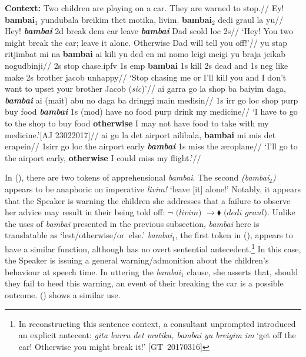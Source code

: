 \pex[interpartskip=1ex]
\a{}\begingl
\glpreamble \textbf{Context:} Two children are playing on a car. They are warned to stop.//
\gla Ey! \textbf{bambai$_1$} yundubala breikim thet motika, livim. \textbf{bambai$_2$} dedi graul la yu//
\glb Hey! \textbf{\textit{bambai}} 2d break {\sc dem} car leave \textbf{\textit{bambai}} Dad scold {\sc loc} 2s//
\glft `Hey! You two might break the car; leave it alone. Otherwise Dad will tell you off!'\trailingcitation[A\&SB: 273]//
\endgl
\a
\begingl{}
\gla yu stap ritjimbat mi na \textbf{bambai} ai kili yu ded en mi nomo leigi meigi yu braja jeikab nogudbinji//
\glb 2s stop chase.\gls{ipfv} 1s {\sc emp} {\bf bambai} 1s kill 2s dead and 1s \gls{neg} like make 2s brother jacob unhappy//
\glft`Stop chasing me or I'll kill you and I don't want to upset your brother Jacob (\textit{sic})'//
\endgl
\a{}\begingl\gla ai garra go la shop ba baiyim daga, \textbf{\textit{bambai}} ai (mait) abu no daga ba dringgi main medisin//
\glb 1s {\sc irr} go {\sc loc} shop {\sc purp} buy food \textit{\textbf{bambai}} 1s (\gls{mod}) have no food \gls{purp} drink my medicine//
\glft `I have to go to the shop to buy food \textbf{otherwise} I may not have food to take with my medicine.'\hspace*{\fill}[AJ 23022017]//
\endgl
\a\begingl\gla ai gu la det \textup{airport} ailibala, \textbf{bambai} mi mis det erapein//
\glb 1s\textdblhyphen\gls{irr} go \gls{loc} the airport early \textit{\textbf{bambai}} 1s miss the æroplane//
\glft`I'll go to the airport early, \textbf{otherwise} I could miss my flight.'\trailingcitation{[GT~16032017-21']}//\endgl
\xe

In (), there are two tokens of apprehensional \textit{bambai}. The second \textit{(bambai$_2$)} appears to be anaphoric on imperative \textit{livim!} `leave [it] alone!' Notably, it appears that the Speaker is warning the children she addresses that a failure to observe her advice may result in their being told off: $\neg \textit{ (livim) }\to\blacklozenge \textit{ (dedi graul)}$. Unlike the uses of \textit{bambai} presented in the previous subsection, \textit{bambai} here is translatable as `lest/otherwise/or~else.' \textit{bambai$_1$}, the first token in (), appears to have a similar function, although has no overt sentential antecedent.\footnote{In reconstructing this sentence context, a consultant unprompted introduced an explicit antecent: \textit{gita burru det mutika, bambai yu breigim im} `get off the car! Otherwise you might break it!' [GT~20170316]} In this case, the Speaker is issuing a general warning/admonition about the children's behaviour at speech time. In uttering the \textit{bambai$_1$} clause, she asserts that, should they fail to heed this warning, an event of their breaking the car is a possible outcome. () shows a similar use.

